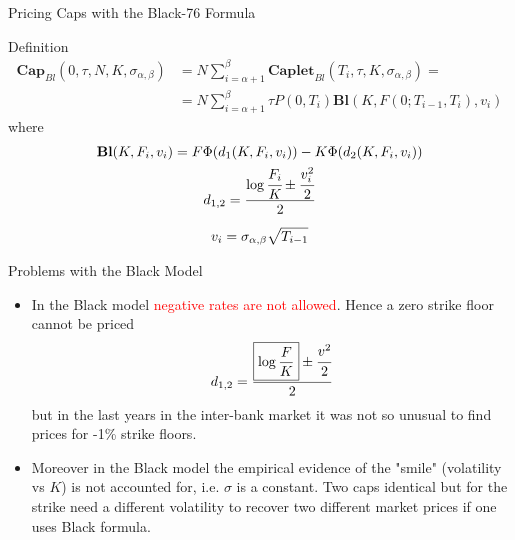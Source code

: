 \documentclass{beamer}
\begin{document}
\begin{frame}{Pricing Caps with the Black-76 Formula}
	\begin{block}{Definition}
	\begin{equation}
		\begin{aligned}
		\textbf{Cap}_{Bl}(0, \tau,N,K,\sigma_{\alpha,\beta}) &= N\sum_{i=\alpha+1}^{\beta}\textbf{Caplet}_{Bl}(T_i, \tau,K,\sigma_{\alpha,\beta}) = \\ &=N\sum_{i=\alpha+1}^{\beta}\tau P(0,T_i) \textbf{Bl}(K,F(0;T_{i-1},T_i),v_i)
		\end{aligned}
		\label{eq:cap_black}
	\end{equation}
	where
	\begin{equation*}
		\begin{gathered}
			\textbf{Bl}(K,F_i,v_i)=F\Phi(d_1(K,F_i,v_i)) - K\Phi(d_2(K,F_i,v_i)) \\
			d_{1,2} = \frac{\log{\cfrac{F_i}{K}} \pm \cfrac{v_i^2}{2}}{2} \\[0.2cm]
			v_i = \sigma_{\alpha,\beta}\sqrt{T_{i-1}}	
		\end{gathered}
	\end{equation*}
	\end{block}
\end{frame}

\begin{frame}{Problems with the Black Model}
\begin{itemize}
	\item In the Black model \textcolor{red}{negative rates are not allowed}. Hence a zero strike floor cannot be priced
	\begin{equation*}
		d_{1,2} = \frac{\boxed{\log{\frac{F}{K}}} \pm \cfrac{v^2}{2}}{2} 
	\end{equation*}
	but in the last years in the inter-bank market it was not so unusual to find prices for -1\% strike floors.
	\item Moreover in the Black model the empirical evidence of the "smile" (volatility vs $K$) is not accounted for, i.e. $\sigma$ is a constant. Two caps identical but for the strike need a different volatility to recover two different market prices if one uses Black formula.
\end{itemize}
\end{frame}
\end{document}
